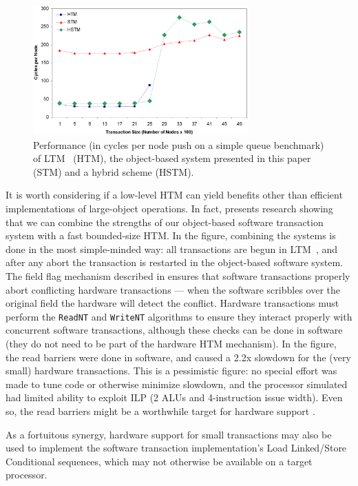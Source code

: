 \begin{figure}[t]\begin{center}%
\includegraphics[width=3.25in,clip=true]{Figures/sean_lie_6b.eps}%
\end{center}%
\caption{Performance (in cycles per node push on a simple queue
  benchmark) of LTM~\cite{AnanianAsKuLeLi04} (HTM), the
  object-based system presented in this paper (STM) and a hybrid
  scheme (HSTM).}%
\label{fig:hybrid}%
\end{figure}
It is worth considering if a low-level HTM can yield benefits other
than efficient implementations of large-object operations.  In fact,
 presents research showing that we can combine the
strengths of our object-based software transaction system with a
fast bounded-size HTM.  In the figure, combining the systems is done
in the most simple-minded way: all transactions are begun in
LTM~\cite{AnanianAsKuLeLi04},
and after any abort the transaction is restarted in the
object-based software system.
  The field flag mechanism described in
 ensures that software transactions properly abort
conflicting hardware transactions --- when the software scribbles
\FLAG over the original field the hardware will detect the conflict.
Hardware transactions must perform
the \texttt{ReadNT} and \texttt{WriteNT} algorithms to ensure they
interact properly with concurrent software transactions, although these
checks can be done in software (they do not need to be part of the
hardware HTM mechanism).  In the figure, the read barriers were done
in software, and caused a 2.2x slowdown for the (very small) hardware
transactions.  This is a pessimistic figure: no special effort was
made to tune code or otherwise minimize slowdown, and the processor
simulated had limited ability to exploit ILP (2 ALUs and 4-instruction
issue width).  Even so, the read barriers might be a worthwhile target
for hardware support \cite{ClickTeWo05}.

As a fortuitous synergy, hardware support for small transactions may
also be used to implement the software transaction implementation's
Load Linked/Store Conditional sequences, which may not
otherwise be available on a target processor.
